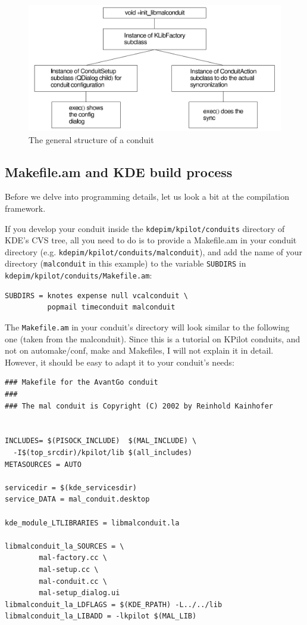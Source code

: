 \documentclass[10pt,a4paper]{article}
\newcommand{\code}[1]{{\small\texttt{#1}}}
\newcommand{\file}[1]{{\small\texttt{#1}}}
\begin{document}
\begin{figure}
\begin{center}
\includegraphics[width=13cm]{ConduitStructure}
\caption{The general structure of a conduit}\label{ConduitStructure}
\end{center}
\end{figure}


\subsection{Makefile.am and KDE build process}

Before we delve into programming details, let us look a bit at the compilation framework.

If you develop your conduit inside the \file{kdepim/kpilot/conduits} directory of KDE's 
CVS tree, all you need to do is to provide a Makefile.am in your conduit directory 
(e.g. \file{kdepim/kpilot/conduits/malconduit}), and add the name of your 
directory (\file{malconduit} in this example) to the variable \code{SUBDIRS} 
in \file{kdepim/kpilot/conduits/Makefile.am}:
{\small
\begin{verbatim}
SUBDIRS = knotes expense null vcalconduit \
          popmail timeconduit malconduit
\end{verbatim}
}
\vspace{1em}

The \file{Makefile.am} in your conduit's directory will look similar to the following one 
(taken from the malconduit). Since this is a tutorial on KPilot conduits, and not 
on automake/conf, make and Makefiles, I will not explain it in detail. However, 
it should be easy to adapt it to your conduit's needs:

{\footnotesize
\begin{verbatim}
### Makefile for the AvantGo conduit
###
### The mal conduit is Copyright (C) 2002 by Reinhold Kainhofer


INCLUDES= $(PISOCK_INCLUDE)  $(MAL_INCLUDE) \
  -I$(top_srcdir)/kpilot/lib $(all_includes)
METASOURCES = AUTO

servicedir = $(kde_servicesdir)
service_DATA = mal_conduit.desktop

kde_module_LTLIBRARIES = libmalconduit.la

libmalconduit_la_SOURCES = \
        mal-factory.cc \
        mal-setup.cc \
        mal-conduit.cc \
        mal-setup_dialog.ui
libmalconduit_la_LDFLAGS = $(KDE_RPATH) -L../../lib
libmalconduit_la_LIBADD = -lkpilot $(MAL_LIB)
\end{verbatim}
}
\end{document}
